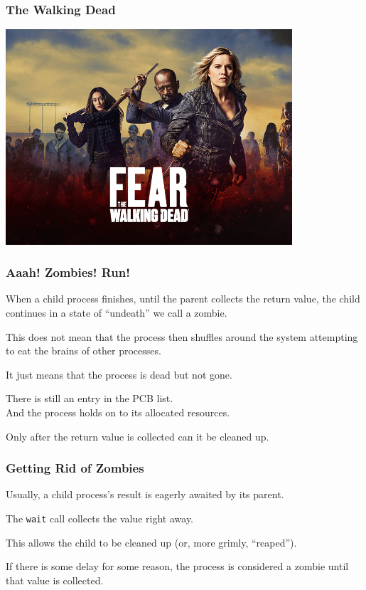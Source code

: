\begin{frame}
\frametitle{The Walking Dead}

\begin{center}
\includegraphics[width=0.8\textwidth]{images/walking-dead.jpg}
\end{center}

\end{frame}



\begin{frame}
\frametitle{Aaah! Zombies! Run!}

When a child process finishes, until the parent collects the return value, the child continues in a state of ``undeath'' we call a \alert{zombie}.

This does not mean that the process then shuffles around the system attempting to eat the brains of other processes.

It just means that the process is dead but not gone.

There is still an entry in the PCB list.\\
\quad And the process holds on to its allocated resources.

Only after the return value is collected can it be cleaned up. 

\end{frame}

\begin{frame}
\frametitle{Getting Rid of Zombies}

Usually, a child process's result is eagerly awaited by its parent. 

The \texttt{wait} call collects the value right away.

This allows the child to be cleaned up (or, more grimly, ``reaped''). 

If there is some delay for some reason, the process is considered a zombie until that value is collected.

\end{frame}


